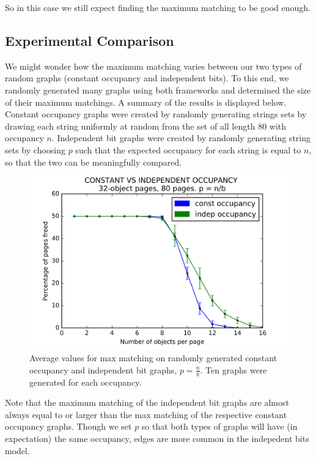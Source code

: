 So in this case we still expect finding the maximum matching to be good enough.

\subsection{Experimental Comparison}
We might wonder how the maximum matching varies between our two types of random graphs (constant occupancy and independent bits).  To this end, we randomly generated many graphs using both frameworks and determined the size of their maximum matchings.  A summary of the results is displayed below.  Constant occupancy graphs were created by randomly generating strings sets by drawing each string uniformly at random from the set of all length 80 with occupancy $n$.  Independent bit graphs were created by randomly generating string sets by choosing $p$ such that the expected occupancy for each string is equal to $n$, so that the two can be meaningfully compared.


\begin{figure}[h]
\includegraphics[scale = .5]{figures/constvindep_32,80.png}
\centering
\caption{Average values for max matching on randomly generated constant occupancy and independent bit graphs, $p = \frac{n}{b}$.  Ten graphs were generated for each occupancy.}
\end{figure}

Note that the maximum matching of the independent bit graphs are almost always equal to or larger than the max matching of the respective constant occupancy graphs.  Though we set $p$ so that both types of graphs will have (in expectation) the same occupancy, edges are more common in the indepedent bits model.  

